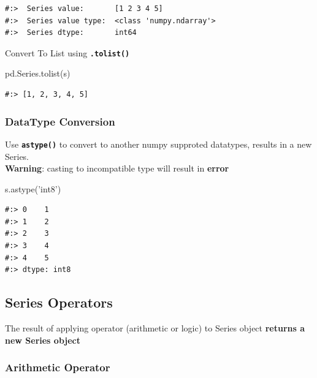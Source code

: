 \documentclass[
]{book}
\newenvironment{Shaded}{\begin{snugshade}}{\end{snugshade}}
\newcommand{\NormalTok}[1]{#1}
\newcommand{\StringTok}[1]{\textcolor[rgb]{0.5,0.5,0.5}{#1}}
\begin{document}
\begin{verbatim}
#:>  Series value:       [1 2 3 4 5] 
#:>  Series value type:  <class 'numpy.ndarray'> 
#:>  Series dtype:       int64
\end{verbatim}

Convert To List using \textbf{\texttt{.tolist()}}

\begin{Shaded}
\begin{Highlighting}[]
\NormalTok{pd.Series.tolist(s)}
\end{Highlighting}
\end{Shaded}

\begin{verbatim}
#:> [1, 2, 3, 4, 5]
\end{verbatim}

\hypertarget{datatype-conversion}{%
\subsubsection{DataType Conversion}\label{datatype-conversion}}

Use \textbf{\texttt{astype()}} to convert to another numpy supproted datatypes, results in a new Series.\\
\textbf{Warning}: casting to incompatible type will result in \textbf{error}

\begin{Shaded}
\begin{Highlighting}[]
\NormalTok{s.astype(}\StringTok{'int8'}\NormalTok{)}
\end{Highlighting}
\end{Shaded}

\begin{verbatim}
#:> 0    1
#:> 1    2
#:> 2    3
#:> 3    4
#:> 4    5
#:> dtype: int8
\end{verbatim}

\hypertarget{series-operators}{%
\subsection{Series Operators}\label{series-operators}}

The result of applying operator (arithmetic or logic) to Series object \textbf{returns a new Series object}

\hypertarget{arithmetic-operator}{%
\subsubsection{Arithmetic Operator}\label{arithmetic-operator}}
\end{document}
